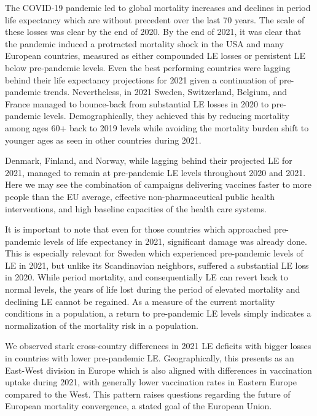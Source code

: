 \documentclass[12pt]{article}
\begin{document}
The COVID-19 pandemic led to global mortality increases and declines in period life expectancy which are without precedent over the last 70 years. The scale of these losses was clear by the end of 2020. By the end of 2021, it was clear that the pandemic induced a protracted mortality shock in the USA and many European countries, measured as either compounded LE losses or persistent LE below pre-pandemic levels. Even the best performing countries were lagging behind their life expectancy projections for 2021 given a continuation of pre-pandemic trends. Nevertheless, in 2021 Sweden, Switzerland, Belgium, and France managed to bounce-back from substantial LE losses in 2020 to pre-pandemic levels. Demographically, they achieved this by reducing mortality among ages 60+ back to 2019 levels while avoiding the mortality burden shift to younger ages as seen in other countries during 2021.

Denmark, Finland, and Norway, while lagging behind their projected LE for 2021, managed to remain at pre-pandemic LE levels throughout 2020 and 2021. Here we may see the combination of  campaigns delivering vaccines faster to more people than the EU average, effective non-pharmaceutical public health interventions, and high baseline capacities of the health care systems.

It is important to note that even for those countries which approached pre-pandemic levels of life expectancy in 2021, significant damage was already done. This is especially relevant for Sweden which experienced pre-pandemic levels of LE in 2021, but unlike its Scandinavian neighbors, suffered a substantial LE loss in 2020. While period mortality, and consequentially LE can revert back to normal levels, the years of life lost during the period of elevated mortality and declining LE cannot be regained. As a measure of the current mortality conditions in a population, a return to pre-pandemic LE levels simply indicates a normalization of the mortality risk in a population.

We observed stark cross-country differences in 2021 LE deficits with bigger losses in countries with lower pre-pandemic LE. Geographically, this presents as an East-West division in Europe which is also aligned with differences in vaccination uptake during 2021, with generally lower vaccination rates in Eastern Europe compared to the West. This pattern raises questions regarding the future of European mortality convergence, a stated goal of the European Union.\citealp{EuropeanComission2009}
\end{document}
